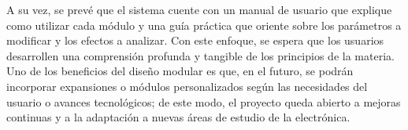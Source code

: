 A su vez, se prevé que el sistema cuente con un manual de usuario que explique como utilizar cada módulo y una guía práctica que oriente sobre los parámetros a modificar y los efectos a analizar. Con este enfoque, se espera que los usuarios desarrollen una comprensión profunda y tangible de los principios de la materia. Uno de los beneficios del diseño modular es que, en el futuro, se podrán incorporar expansiones o módulos personalizados según las necesidades del usuario o avances tecnológicos; de este modo, el proyecto queda abierto a mejoras continuas y a la adaptación a nuevas áreas de estudio de la electrónica.


